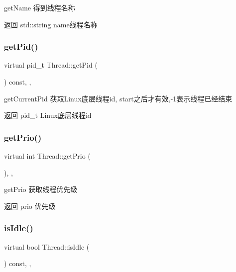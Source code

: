 get\+Name 得到线程名称 

\begin{DoxyReturn}{返回}
std\+::string name线程名称 
\end{DoxyReturn}
\mbox{\label{classThread_ad7fd4dfa0edff93d118b2edf5ab7be2c}} 
\subsubsection{\texorpdfstring{get\+Pid()}{getPid()}}
{\footnotesize\ttfamily virtual pid\+\_\+t Thread\+::get\+Pid (\begin{DoxyParamCaption}{ }\end{DoxyParamCaption}) const\hspace{0.3cm}{\ttfamily [inline]}, {\ttfamily [final]}, {\ttfamily [virtual]}}



get\+Current\+Pid 获取\+Linux底层线程id, start之后才有效,-\/1表示线程已经结束 

\begin{DoxyReturn}{返回}
pid\+\_\+t Linux底层线程id 
\end{DoxyReturn}
\mbox{\label{classThread_a712ab58b9e89f458427b213b1197a666}} 
\subsubsection{\texorpdfstring{get\+Prio()}{getPrio()}}
{\footnotesize\ttfamily virtual int Thread\+::get\+Prio (\begin{DoxyParamCaption}{ }\end{DoxyParamCaption})\hspace{0.3cm}{\ttfamily [inline]}, {\ttfamily [final]}, {\ttfamily [virtual]}}



get\+Prio 获取线程优先级 

\begin{DoxyReturn}{返回}
prio 优先级 
\end{DoxyReturn}
\mbox{\label{classThread_acb6c590deecea4778a855459f080060a}} 
\subsubsection{\texorpdfstring{is\+Idle()}{isIdle()}}
{\footnotesize\ttfamily virtual bool Thread\+::is\+Idle (\begin{DoxyParamCaption}{ }\end{DoxyParamCaption}) const\hspace{0.3cm}{\ttfamily [inline]}, {\ttfamily [final]}, {\ttfamily [virtual]}}




